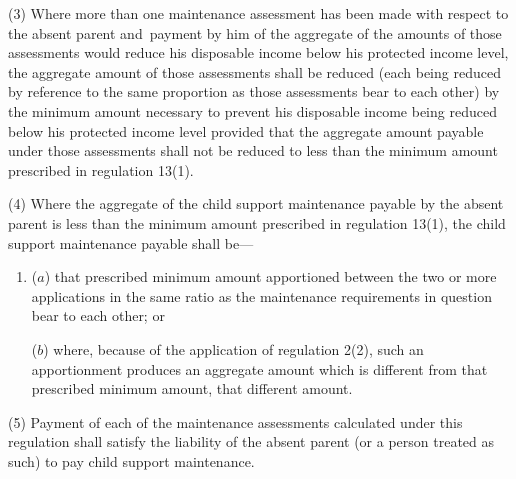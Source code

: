 \documentclass[12pt,a4paper]{article}
\begin{document}
(3) Where more than one maintenance assessment has been made with respect to the absent parent and~payment by him of the aggregate of the amounts of those assessments would reduce his disposable income below his protected income level, the aggregate amount of those assessments shall be reduced (each being reduced by reference to the same proportion as those assessments bear to each other) by the minimum amount necessary to prevent his disposable income being reduced below his protected income level provided that the aggregate amount payable under those assessments shall not be reduced to less than the minimum amount prescribed in regulation 13(1).

(4) Where the aggregate of the child support maintenance payable by the absent parent is less than the minimum amount prescribed in regulation 13(1), the child support maintenance payable shall be---
\begin{enumerate}\item[]
($a$) that prescribed minimum amount apportioned between the two or more applications in the same ratio as the maintenance requirements in question bear to each other; or

($b$) where, because of the application of regulation 2(2), such an apportionment produces an aggregate amount which is different from that prescribed minimum amount, that different amount.
\end{enumerate}

(5) Payment of each of the maintenance assessments calculated under this regulation shall satisfy the liability of the absent parent (or a person treated as such) to pay child support maintenance.

\end{document}
